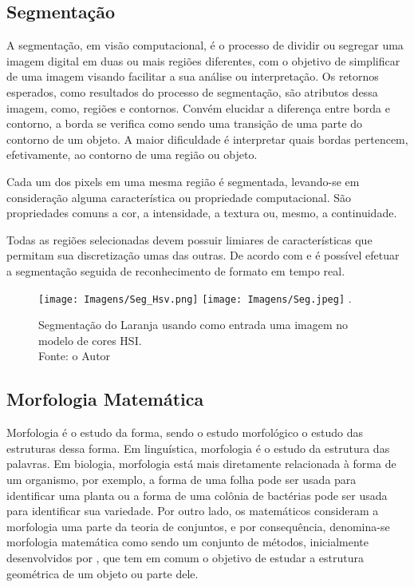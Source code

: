 \subsection{Segmentação}

A segmentação, em visão computacional, é o processo de dividir ou segregar uma imagem digital em duas ou mais regiões diferentes, com o objetivo de simplificar de uma imagem visando facilitar a sua análise ou interpretação. Os retornos esperados, como resultados do processo de segmentação, são atributos dessa imagem, como, regiões e contornos. Convém elucidar a diferença entre borda e contorno, a borda se verifica como sendo uma transição de uma parte do contorno de um objeto. A maior dificuldade é interpretar quais bordas pertencem, efetivamente, ao contorno de uma região ou objeto.

Cada um dos pixels em uma mesma região é segmentada, levando-se em consideração alguma característica ou propriedade computacional. São propriedades comuns a cor, a intensidade, a textura ou, mesmo, a continuidade. 

Todas as regiões selecionadas devem possuir limiares de características que permitam sua discretização umas das outras. De acordo com  e  é possível efetuar a segmentação seguida de reconhecimento de formato em tempo real. 

\begin{figure}[!h1]
\centering
\texttt{[image: Imagens/Seg\_Hsv.png]}
\texttt{[image: Imagens/Seg.jpeg]}
\DeclareGraphicsExtensions.
\caption{Segmentação do Laranja usando como entrada uma imagem no modelo de cores HSI. \\ Fonte: o Autor}
\label{Fig:Seg}
\end{figure}


\subsection{Morfologia Matemática}

Morfologia é o estudo da forma, sendo o estudo morfológico o estudo das estruturas dessa forma. Em linguística, morfologia é o estudo da estrutura das palavras. Em biologia, morfologia está mais diretamente relacionada à forma de um organismo, por exemplo, a forma de uma folha pode ser usada para identificar uma planta ou a forma de uma colônia de bactérias pode ser usada para identificar sua variedade.
Por outro lado, os matemáticos consideram a morfologia uma parte da teoria de conjuntos, e por consequência, denomina-se morfologia matemática como sendo um conjunto de métodos, inicialmente desenvolvidos por , que tem em comum o objetivo de estudar a estrutura geométrica de um objeto ou parte dele. 

